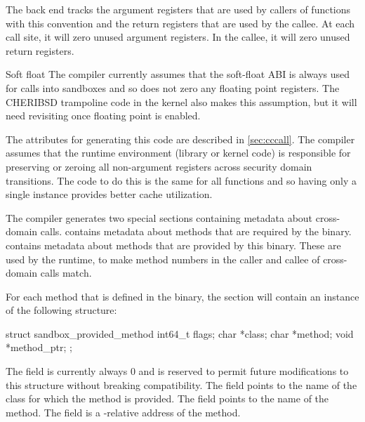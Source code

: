 The back end tracks the argument registers that are used by callers of functions with this convention and the return registers that are used by the callee.
At each call site, it will zero unused argument registers.
In the callee, it will zero unused return registers.

\begin{notebox}{Soft float}
	The compiler currently assumes that the soft-float ABI is always used for calls into sandboxes and so does not zero any floating point registers.
	The CHERIBSD trampoline code in the kernel also makes this assumption, but it will need revisiting once floating point is enabled.
\end{notebox}

The attributes for generating this code are described in \autoref{sec:cccall}.
The compiler assumes that the runtime environment (library or kernel code) is responsible for preserving or zeroing all non-argument registers across security domain transitions.
The code to do this is the same for all functions and so having only a single instance provides better cache utilization.

The compiler generates two special sections containing metadata about cross-domain calls.
 contains metadata about methods that are required by the binary.
 contains metadata about methods that are provided by this binary.
These are used by the  runtime, to make method numbers in the caller and callee of cross-domain calls match.

For each method that is defined in the binary, the  section will contain an instance of the following structure:

\begin{csnippet}
struct sandbox_provided_method
{
	int64_t   flags;
	char     *class;
	char     *method;
	void     *method_ptr;
};
\end{csnippet}

The  field is currently always 0 and is reserved to permit future modifications to this structure without breaking compatibility.
The  field points to the name of the class for which the method is provided.
The  field points to the name of the method.
The  field is a -relative address of the method.

